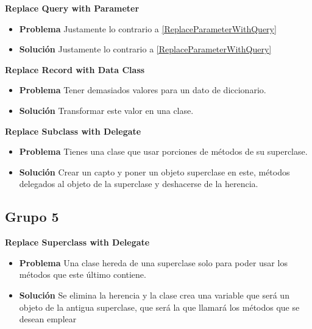 \documentclass[11pt,a4paper,oneside]{book}
\begin{document}
\textbf{Replace Query with Parameter}
\label{replaceQueryWithParameter}
\begin{itemize}
    \item \textbf{Problema} Justamente lo contrario a \ref{ReplaceParameterWithQuery}
    
    
    \item \textbf{Solución} Justamente lo contrario a \ref{ReplaceParameterWithQuery}
    
\end{itemize}

\textbf{Replace Record with Data Class}
\label{ReplaceRecordWithDataClass}
\begin{itemize}
    \item \textbf{Problema} Tener demasiados valores para un dato de diccionario.
    
    
    \item \textbf{Solución} Transformar este valor en una clase.
    
\end{itemize}

\textbf{Replace Subclass with Delegate}
\label{ReplaceSubclassWithDelegate}
\begin{itemize}
    \item \textbf{Problema} Tienes una clase que usar porciones de métodos de su superclase.
    
    
    \item \textbf{Solución} Crear un capto y poner un objeto superclase en este, métodos delegados al objeto de la superclase y deshacerse de la herencia.
    
\end{itemize}


\subsection{Grupo 5}
\textbf{Replace Superclass with Delegate}
\label{replaceSuperclassWithDelegate}
\begin{itemize}
    \item \textbf{Problema} Una clase hereda de una superclase solo para poder usar los métodos que este último contiene.
    
    
    \item \textbf{Solución} Se elimina la herencia y la clase crea una variable que será un objeto de la antigua superclase, que será la que llamará los métodos que se desean emplear
    
\end{itemize}
\end{document}
